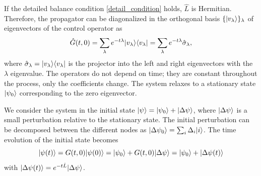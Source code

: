 If the detailed balance condition \eqref{detail_condition} holds, $\hat L$ is Hermitian. Therefore, the propagator can be diagonalized in the orthogonal basis $\{\lvert v_\lambda\rangle\}_\lambda$ of eigenvectors of the control operator as
\begin{equation}\label{diagonal_propagator}
    \hat G(t,0) = \sum_\lambda e^{-t\lambda} \lvert v_\lambda\rangle\langle v_\lambda\rvert = \sum_\lambda e^{-t\lambda} \hat \sigma_\lambda,
\end{equation}
where $\hat \sigma_\lambda = \lvert v_\lambda\rangle\langle v_\lambda\rvert$ is the projector into the left and right eigenvectors with the $\lambda$ eigenvalue. The operators do not depend on time; they are constant throughout the process, only the coefficients change.
The system relaxes to a stationary state $\lvert\psi_0\rangle$ corresponding to the zero eigenvector.

We consider the system in the initial state $\lvert\psi\rangle = \lvert\psi_0\rangle + \lvert\Delta\psi\rangle$, where $\lvert\Delta\psi\rangle$ is a small perturbation relative to the stationary state. The initial perturbation can be decomposed between the different nodes as $\lvert\Delta\psi_0\rangle = \sum_i \Delta_i \lvert i\rangle$.
The time evolution of the initial state becomes
\begin{equation}
    \lvert\psi(t)\rangle = G(t,0) \lvert\psi(0)\rangle = \lvert\psi_0\rangle + G(t,0)\lvert\Delta\psi\rangle = \lvert\psi_0\rangle + \lvert\Delta\psi(t)\rangle
\end{equation}
with $\lvert\Delta\psi(t)\rangle = e^{-t\hat L} \lvert\Delta \psi\rangle$.


